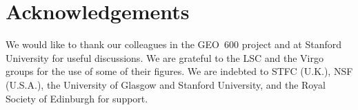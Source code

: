 \documentclass{article}
\begin{document}
\newpage

\section{Acknowledgements}
\label{section:acknowledgements}

We would like to thank our colleagues in the GEO~600 project and at Stanford
University for useful discussions. We are grateful to the LSC and the Virgo
groups for the use of some of their figures. We are indebted to STFC (U.K.), 
NSF (U.S.A.), the University of Glasgow and Stanford University, and the Royal
Society of Edinburgh for support.


\newpage


\end{document}

